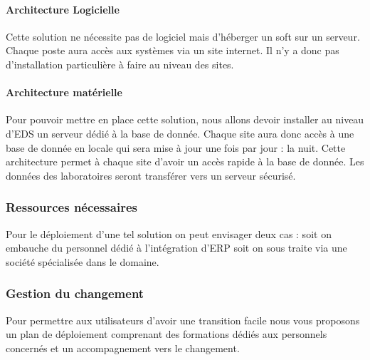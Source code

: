 \paragraph{Architecture Logicielle}
Cette solution ne nécessite pas de logiciel mais d'héberger un soft sur un serveur. Chaque poste aura accès aux systèmes via un site internet. Il n'y a donc pas d'installation particulière à faire au niveau des sites.
\paragraph{Architecture matérielle}
Pour pouvoir mettre en place cette solution, nous allons devoir installer au niveau d'EDS un serveur dédié à la base de donnée. Chaque site aura donc accès à une base de donnée en locale qui sera mise à jour une fois par jour : la nuit. Cette architecture permet à chaque site d'avoir un accès rapide à la base de donnée. Les données des laboratoires seront transférer vers un serveur sécurisé. 
\subsubsection{Ressources nécessaires}
Pour le déploiement d'une tel solution on peut envisager deux cas : soit on embauche du personnel dédié à l'intégration d'ERP soit on sous traite via une société spécialisée dans le domaine.
\subsubsection{Gestion du changement}
Pour permettre aux utilisateurs d'avoir une transition facile nous vous proposons un plan de déploiement comprenant des formations dédiés aux personnels concernés et un accompagnement vers le changement.
